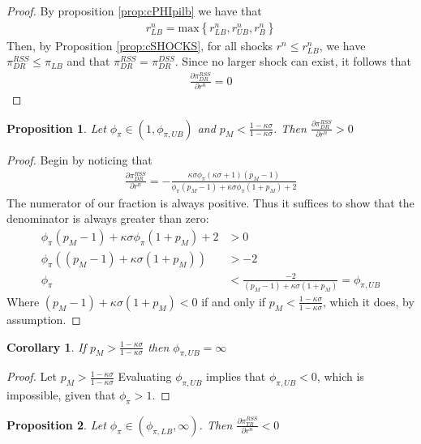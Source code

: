 \documentclass[11pt]{article}
\newtheorem{proposition}{Proposition}
\newtheorem{corollary}{Corollary}[proposition]
\begin{document}
	\begin{proof}
		By proposition \ref{prop:cPHIpilb} we have that 
		\begin{align*}
			r^n_{LB} = \text{max}\left\{r^n_{LB}, r^n_{UB}, r^n_{B}\right\}
		\end{align*}
		Then, by Proposition \ref{prop:cSHOCKS}, for all shocks $r^n\le r^n_{LB}$, we have $\pi_{DR}^{RSS}\le\pi_{LB} $ and that $\pi_{DR}^{RSS} = \pi_{DR}^{DSS}$. Since no larger shock can exist, it follows that 
		\begin{align*}
			\frac{\partial\pi_{DR}^{RSS}}{\partial r^n} = 0
		\end{align*}
	\end{proof}
	\begin{proposition}\label{prop:pi_dr_pos}
		Let $\phi_{\pi}\in(1,\phi_{\pi,UB})$ and $p_M < \frac{1-\kappa\sigma}{1-\kappa\sigma}$. Then $\frac{\partial\pi_{DR}^{RSS}}{\partial r^n} > 0 $ 
	\end{proposition} 
	\begin{proof}
		Begin by noticing that 
		\begin{align*}
			\frac{\partial \pi_{DR}^{RSS}}{\partial r^n} = -\frac{\kappa\sigma\phi_{\pi}(\kappa\sigma+1)(p_M-1)}{\phi_{\pi}(p_M-1) + \kappa\sigma\phi_{\pi}(1+p_M) + 2}
		\end{align*}
		The numerator of our fraction is always positive. Thus it suffices to show that the denominator is always greater than zero:
		\begin{align*}
			\phi_{\pi}(p_M-1) + \kappa\sigma\phi_{\pi}(1+p_M) + 2 &> 0\\
			\phi_{\pi}((p_M-1) + \kappa\sigma(1+p_M)) &> -2\\
			\phi_{\pi} &< \frac{-2}{(p_M-1) + \kappa\sigma(1+p_M)} = \phi_{\pi,UB} 	
		\end{align*}
		Where $(p_M-1) + \kappa\sigma(1+p_M)<0$ if and only if $p_M < \frac{1-\kappa\sigma}{1-\kappa\sigma}$, which it does, by assumption. 
	\end{proof}
	\begin{corollary}
		If $p_M > \frac{1-\kappa\sigma}{1-\kappa\sigma}$ then $\phi_{\pi,UB} = \infty$
	\end{corollary}
	\begin{proof}
		Let $p_M > \frac{1-\kappa\sigma}{1-\kappa\sigma}$ Evaluating $\phi_{\pi,UB}$ implies that $\phi_{\pi,UB} < 0$, which is impossible, given that $\phi_{\pi}>1$.
	\end{proof}
	\begin{proposition}\label{prop:pi_tr_neg}
		Let $\phi_{\pi}\in(\phi_{\pi,LB},\infty)$. Then $\frac{\partial\pi_{TR}^{RSS}}{\partial r^n} < 0 $ 
	\end{proposition} 
\end{document}
